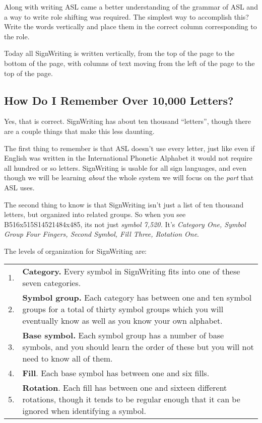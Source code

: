 \documentclass{article}
\begin{document}
Along with writing ASL came a better understanding of the grammar of ASL and a way to write role shifting was required.
The simplest way to accomplish this?
Write the words vertically and place them in the correct column corresponding to the role.

Today all SignWriting is written vertically, from the top of the page to the bottom of the page, with columns of text moving from the left of the page to the top of the page.

\subsection{How Do I Remember Over 10,000 Letters?}

Yes, that is correct.
SignWriting has about ten thousand ``letters'', though there are a couple things that make this less daunting.

The first thing to remember is that ASL doesn't use every letter, just like even if English was written in the International Phonetic Alphabet it would not require all hundred or so letters.
SignWriting is usable for all sign languages, and even though we will be learning \emph{about} the whole system we will focus on the \emph{part} that ASL uses.

The second thing to know is that SignWriting isn't just a list of ten thousand letters, but organized into related groups.
So when you see B516x515S14521484x485, its not just \emph{symbol 7,520.}
It's \emph{Category One, Symbol Group Four Fingers, Second Symbol, Fill Three, Rotation One}.

The levels of organization for SignWriting are:

\begin{tabular}{p{1cm}p{14cm}}
\hfil 1.&\textbf{Category.}
Every symbol in SignWriting fits into one of these seven categories.\\
\hfil 2.&\textbf{Symbol group.}
Each category has between one and ten symbol groups for a total of thirty symbol groups which you will eventually know as well as you know your own alphabet.\\
\hfil 3.&\textbf{Base symbol.}
Each symbol group has a number of base symbols, and you should learn the order of these but you will not need to know all of them.\\
\hfil 4.&\textbf{Fill}.
Each base symbol has between one and six fills.\\
\hfil 5.&\textbf{Rotation}.
Each fill has between one and sixteen different rotations, though it tends to be regular enough that it can be ignored when identifying a symbol.\\
\end{tabular}
\end{document}
